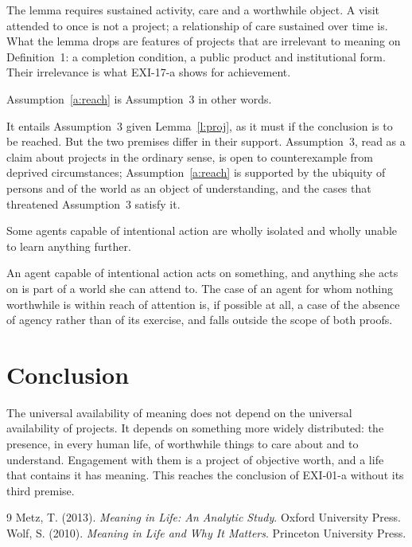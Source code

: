 \documentclass{situationist-preprint}
\begin{document}
\begin{reply}
The lemma requires sustained activity, care and a worthwhile object. A visit attended to once is not a project; a relationship of care sustained over time is. What the lemma drops are features of projects that are irrelevant to meaning on Definition~1: a completion condition, a public product and institutional form. Their irrelevance is what EXI-17-a shows for achievement.
\end{reply}

\begin{objection}
Assumption~\ref{a:reach} is Assumption~3 in other words.
\end{objection}

\begin{reply}
It entails Assumption~3 given Lemma~\ref{l:proj}, as it must if the conclusion is to be reached. But the two premises differ in their support. Assumption~3, read as a claim about projects in the ordinary sense, is open to counterexample from deprived circumstances; Assumption~\ref{a:reach} is supported by the ubiquity of persons and of the world as an object of understanding, and the cases that threatened Assumption~3 satisfy it.
\end{reply}

\begin{objection}
Some agents capable of intentional action are wholly isolated and wholly unable to learn anything further.
\end{objection}

\begin{reply}
An agent capable of intentional action acts on something, and anything she acts on is part of a world she can attend to. The case of an agent for whom nothing worthwhile is within reach of attention is, if possible at all, a case of the absence of agency rather than of its exercise, and falls outside the scope of both proofs.
\end{reply}

\section{Conclusion}

The universal availability of meaning does not depend on the universal availability of projects. It depends on something more widely distributed: the presence, in every human life, of worthwhile things to care about and to understand. Engagement with them is a project of objective worth, and a life that contains it has meaning. This reaches the conclusion of EXI-01-a without its third premise.

\begin{thebibliography}{9}\small
{} Metz, T. (2013). \emph{Meaning in Life: An Analytic Study}. Oxford University Press.
 Wolf, S. (2010). \emph{Meaning in Life and Why It Matters}. Princeton University Press.
\end{thebibliography}
\end{document}
